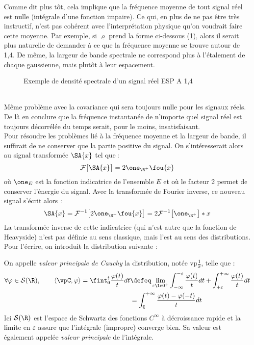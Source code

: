 Comme dit plus tôt, cela implique que la fréquence moyenne de tout signal réel est nulle (intégrale d'une fonction impaire). Ce qui, en plus de ne pas être très instructif, n'est pas cohérent avec l'interprétation physique qu'on voudrait faire cette moyenne. Par exemple, si $\varrho$ prend la forme ci-dessous (\cref{fig:densi_spec_sym}), alors il serait plus naturelle de demander à ce que la fréquence moyenne se trouve autour de 1,4. De même, la largeur de bande spectrale ne correspond plus à l'étalement de chaque gaussienne, mais plutôt à leur espacement.
\\
\begin{figure}[h]\centering
	\caption{Exemple de densité spectrale d'un signal réel ESP A 1,4}
	\label{fig:densi_spec_sym}
\end{figure}
\\
Même problème avec la covariance qui sera toujours nulle pour les signaux réels. De là en conclure que la fréquence instantanée de n'importe quel signal réel est toujours décorrélée du temps serait, pour le moins, insatisfaisant.
\\

Pour résoudre les problèmes lié à la fréquence moyenne et la largeur de bande, il suffirait de ne conserver que la partie positive du signal. On s'intéresserait alors au signal transformée $\SA{x}$ tel que :
\[\mathcal{F}\big[\SA{x}\big] = 2\one_{\R^+}\fou{x}\]
où $\one_E$ est la fonction indicatrice de l'ensemble $E$ et où le facteur 2 permet de conserver l'énergie du signal.
Avec la transformée de Fourier inverse, ce nouveau signal s'écrit alors :
\[\SA{x} = \mathcal{F}^{-1}\big[ 2\one_{\R^+}\fou{x} \big] = 2 \mathcal{F}^{-1}\big[\one_{\R^+}\big] * x\]
La transformée inverse de cette indicatrice (qui n'est autre que la fonction de Heavyside) n'est pas définie au sens classique, mais l'est au sens des distributions. Pour l'écrire, on introduit la distribution suivante :


\begin{definition}\label{def:vp&Hilb}
	On appelle \emph{valeur principale de Cauchy} la distribution, notée vp$\frac{1}{x}$, telle que :
	\begin{equation}
		\begin{aligned}
		\forall \varphi\in\mathcal{S}(\R),\qquad 
			\left\langle \vpC, \varphi \right\rangle 
			= \fint_0^t \frac{\varphi(t)}{t}dt 
			&\defeq \lim_{\varepsilon\lr0^+} \int_{-\infty}^{-\varepsilon} \frac{\varphi(t)}{t}dt + \int_{+\varepsilon}^{+\infty} \frac{\varphi(t)}{t}dt \\
			&= \int_0^{+\infty} \frac{\varphi(t) - \varphi(-t)}{t}dt
		\end{aligned}
	\end{equation}
	Ici $\mathcal{S}(\R)$ est l’espace de Schwartz des fonctions $C^\infty$ à décroissance rapide et la limite en $\varepsilon$ assure que l'intégrale (impropre) converge bien. Sa valeur est également appelée \emph{valeur principale} de l'intégrale. 
\end{definition}

